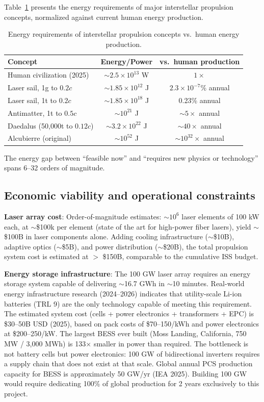 \documentclass[11pt,a4paper,onecolumn]{article}
\begin{document}
Table~\ref{tab:energia} presents the energy requirements of major interstellar propulsion concepts, normalized against current human energy production.

\begin{table}[h]
\centering
\caption{Energy requirements of interstellar propulsion concepts vs.\ human energy production.}
\label{tab:energia}
\begin{tabular}{lcc}
\hline
\textbf{Concept} & \textbf{Energy/Power} & \textbf{vs.\ human production} \\
\hline
Human civilization (2025) & $\sim2.5\times10^{13}$ W & $1\times$ \\
Laser sail, 1g to $0.2c$ & $\sim1.85\times10^{12}$ J & $2.3\times10^{-7}$\% annual \\
Laser sail, 1t to $0.2c$ & $\sim1.85\times10^{18}$ J & 0.23\% annual \\
Antimatter, 1t to $0.5c$ & $\sim10^{21}$ J & $\sim5\times$ annual \\
Daedalus (50,000t to $0.12c$) & $\sim3.2\times10^{22}$ J & $\sim40\times$ annual \\
Alcubierre (original) & $\sim10^{52}$ J & $\sim10^{32}\times$ annual \\
\hline
\end{tabular}
\end{table}

The energy gap between ``feasible now'' and ``requires new physics or technology'' spans 6--32 orders of magnitude.

\subsection{Economic viability and operational constraints}

\textbf{Laser array cost}: Order-of-magnitude estimates: $\sim10^6$ laser elements of 100 kW each, at $\sim$\$100k per element (state of the art for high-power fiber lasers), yield $\sim$\$100B in laser components alone. Adding cooling infrastructure ($\sim$\$10B), adaptive optics ($\sim$\$5B), and power distribution ($\sim$\$20B), the total propulsion system cost is estimated at $>$ \$150B, comparable to the cumulative ISS budget.

\textbf{Energy storage infrastructure}: The 100 GW laser array requires an energy storage system capable of delivering $\sim$16.7 GWh in $\sim$10 minutes. Real-world energy infrastructure research (2024--2026) indicates that utility-scale Li-ion batteries (TRL 9) are the only technology capable of meeting this requirement. The estimated system cost (cells + power electronics + transformers + EPC) is \$30--50B USD (2025), based on pack costs of \$70--150/kWh and power electronics at \$200--250/kW. The largest BESS ever built (Moss Landing, California, 750 MW / 3,000 MWh) is 133$\times$ smaller in power than required. The bottleneck is not battery cells but power electronics: 100 GW of bidirectional inverters requires a supply chain that does not exist at that scale. Global annual PCS production capacity for BESS is approximately 50 GW/yr (IEA 2025). Building 100 GW would require dedicating 100\% of global production for 2 years exclusively to this project.
\end{document}
